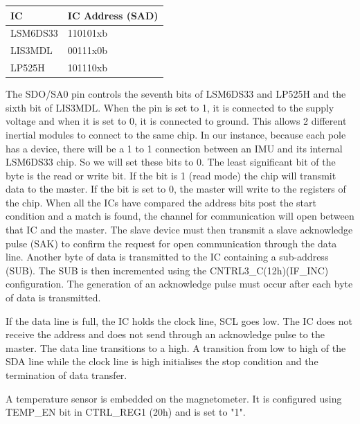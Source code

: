 \documentclass[12pt]{article}
\begin{document}
\begin{table}[]
  \begin{tabular}{|l|l|}
    \hline
  IC       & IC Address (SAD) \\\hline
  LSM6DS33 & 110101xb         \\\hline
  LIS3MDL  & 00111x0b         \\\hline
  LP525H   & 101110xb        \\ \hline
  \end{tabular}
  \end{table}
  The SDO/SA0 pin controls the seventh bits of LSM6DS33 and LP525H and the sixth bit   of LIS3MDL. When the pin is set to 1, it is connected to the supply voltage and when it is set to 0, it is connected to ground. This allows 2 different inertial modules to connect to the same chip. In our instance, because each pole has a device, there will be a 1 to 1 connection between an IMU and its internal LSM6DS33 chip. So we will set these bits to 0. The least significant bit of the byte is the read or write bit. If the bit is 1 (read mode) the chip will transmit data to the master. If the bit is set to 0, the master will write to the registers of the chip. 
When all the ICs have compared the address bits post the start condition and a match is found, the channel for communication will open between that IC and the master. The slave device must then transmit a slave acknowledge pulse (SAK) to confirm the request for open communication through the data line. 
Another byte of data is transmitted to the IC containing a sub-address (SUB). The SUB is then incremented using the CNTRL3\_C(12h)(IF\_INC) configuration. The generation of an acknowledge pulse must occur after each byte of data is transmitted.

If the data line is full, the IC holds the clock line, SCL goes low. The IC does not receive the address and does not send through an acknowledge pulse to the master. The data line transitions to a high. A transition from low to high of the SDA line while the clock line is high initialises the stop condition and the termination of data transfer. 

A temperature sensor is embedded on the magnetometer. It is configured using \\ TEMP\_EN bit in CTRL\_REG1 (20h) and is set to "1". 
\end{document}

